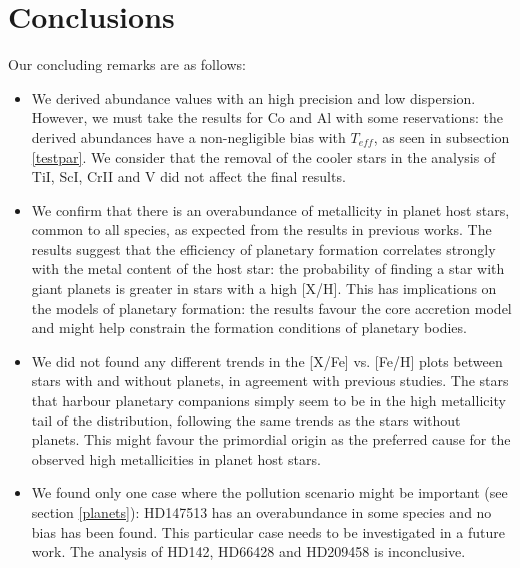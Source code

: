 \documentclass[dvips,12pt,a4paper]{report}
\begin{document}
{{\section {Conclusions}

Our concluding remarks are as follows:

\begin{itemize}

\item We derived abundance values with an high precision and low dispersion. However, we must take the results for Co and Al with some reservations: the derived abundances have a non-negligible bias with $T_{eff}$, as seen in subsection \ref{testpar}. We consider that the removal of the cooler stars in the analysis of TiI, ScI, CrII and V did not affect the final results.
\item We confirm that there is an overabundance of metallicity in planet host stars, common to all species, as expected from the results in previous works. The results suggest that the efficiency of planetary formation correlates strongly with the metal content of the host star: the probability of finding a star with giant planets is greater in stars with a high [X/H]. This has implications on the models of planetary formation: the results favour the core accretion model and might help constrain the formation conditions of planetary bodies.
\item We did not found any different trends in the [X/Fe] vs. [Fe/H] plots between stars with and without planets, in agreement with previous studies. The stars that harbour planetary companions simply seem to be in the high metallicity tail of the distribution, following the same trends as the stars without planets. This might favour the primordial origin as the preferred cause for the observed high metallicities in planet host stars. %
\item We found only one case where the pollution scenario might be important (see section \ref{planets}): HD147513 has an overabundance in some species and no bias has been found. This particular case needs to be investigated in a future work. The analysis of HD142, HD66428 and HD209458 is inconclusive.


\end{itemize}}}
\end{document}
